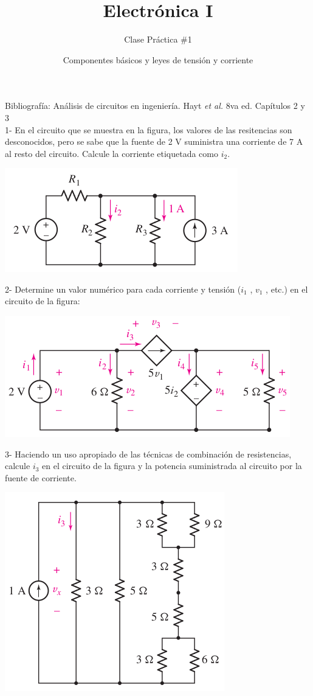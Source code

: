 \documentclass[10pt,letterpaper]{article}
\author{Clase Práctica $\#$1}
\title{Electrónica I}
\date{Componentes básicos y leyes de tensión y corriente}
\begin{document}
	\maketitle
	

Bibliografía: Análisis de circuitos en ingeniería. Hayt \textit{et al.} 8va ed. Capítulos 2 y 3
\\

	
 1- En el circuito que se muestra en la figura, los valores de las resitencias son desconocidos, pero se sabe que la fuente de 2 $\mathrm{V}$ suministra una corriente de 7 $\mathrm{A}$ al resto del circuito. Calcule la corriente etiquetada como $i_2$.

\includegraphics[width=.5\linewidth]{ej1}	

2- Determine un valor numérico para cada corriente y tensión ($i_1$ , $v_1$ , etc.) en el circuito de la figura:

\includegraphics[width=.5\linewidth]{ej2}	

3- Haciendo un uso apropiado de las técnicas de combinación de resistencias, calcule $i_3$ en el circuito de la figura y la potencia suministrada al circuito por la fuente de corriente.

\includegraphics[width=.45\linewidth]{ej3}
\end{document}
